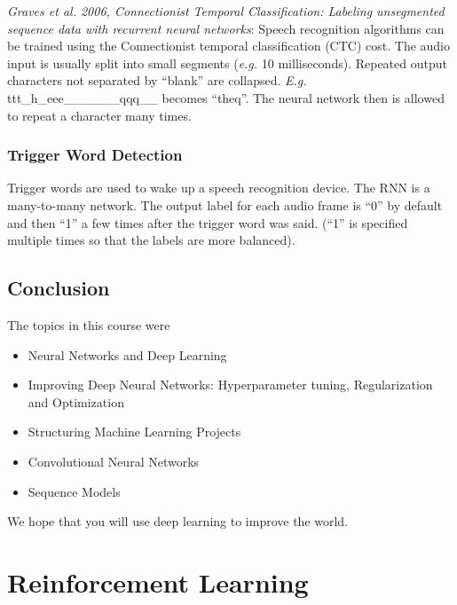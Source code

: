 \documentclass{article}
\begin{document}
\emph{Graves et al. 2006, Connectionist Temporal Classification: Labeling unsegmented sequence data with recurrent neural networks}:
Speech recognition algorithms can be trained using the Connectionist temporal classification (CTC) cost.
The audio input is usually split into small segments (\emph{e.g.} 10 milliseconds).
Repeated output characters not separated by ``blank'' are collapsed.
\emph{E.g.} ttt\_h\_eee\_\_\_\textvisiblespace\_\_\_qqq\_\_ becomes ``the\textvisiblespace q''.
The neural network then is allowed to repeat a character many times.

\subsubsection{Trigger Word Detection}
Trigger words are used to wake up a speech recognition device.
The RNN is a many-to-many network.
The output label for each audio frame is ``0'' by default and then ``1'' a few times after the trigger word was said.
(``1'' is specified multiple times so that the labels are more balanced).

\subsection{Conclusion}
The topics in this course were
\begin{itemize}
  \item Neural Networks and Deep Learning
  \item Improving Deep Neural Networks: Hyperparameter tuning, Regularization and Optimization
  \item Structuring Machine Learning Projects
  \item Convolutional Neural Networks
  \item Sequence Models
\end{itemize}
We hope that you will use deep learning to improve the world.

\appendix

\section{Reinforcement Learning}
\end{document}
